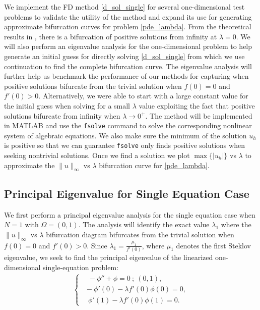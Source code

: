 \documentclass[12pt, reqno]{amsart}
\numberwithin{equation}{section}
\begin{document}
We implement the FD method \eqref{d_sol_single} for several one-dimensional test problems to validate the utility of the method and expand its use for generating approximate bifurcation curves for problem \eqref{pde_lambda}.
From the theoretical results in \cite{BCDMP_2024}, there is a bifurcation of positive solutions from infinity at $\lambda=0$. 
We will also perform an eigenvalue analysis for the one-dimensional problem to help generate an initial guess for directly solving \eqref{d_sol_single} from which we use continuation to find the complete bifurcation curve.
The eigenvalue analysis will further help us benchmark the performance of our methods for capturing when positive solutions bifurcate from the trivial solution when $f(0) = 0$ and $f'(0)>0$.  
Alternatively, we were able to start with a large constant value for the initial guess when solving for a small $\lambda$ value exploiting the fact that positive solutions bifurcate from infinity when $\lambda \to 0^+$.  
The method will be implemented in MATLAB and use the \texttt{fsolve} command to solve the corresponding nonlinear system of algebraic equations.  
We also make sure the minimum of the solution $u_h$ is positive so that we can guarantee \texttt{fsolve} only finds positive solutions when seeking nontrivial solutions. Once we find a solution we plot $\max\{|u_h|\}$ vs $\lambda$ to approximate the  $\|u\|_{\infty}$ vs $\lambda$ bifurcation curve for \eqref{pde_lambda}.



\subsection{Principal Eigenvalue for Single Equation Case}
We first perform a principal eigenvalue analysis for the single equation case when $N=1$ with $\Omega = (0,1)$.  
The analysis will identify the exact value $\lambda_1$ where the $\| u \|_{\infty}$ vs $\lambda$ bifurcation diagram bifurcates  from the trivial solution when $f(0) = 0$ and $f'(0) > 0$.  
Since $\lambda_1 = \frac{\mu_1}{f'(0)}$, where $\mu_1$ denotes the first Steklov eigenvalue, 
we seek to find the principal eigenvalue of the linearized one-dimensional single-equation problem:
\begin{align*}
    \begin{cases}
        ~~~~ -\phi'' + \phi = 0 ~;~ (0,1), \\
        ~~ -\phi'(0) - \lambda f'(0) \phi(0) = 0, \\
        ~~~~ \phi'(1) - \lambda f'(0) \phi(1) = 0.
    \end{cases}
\end{align*}
\end{document}
